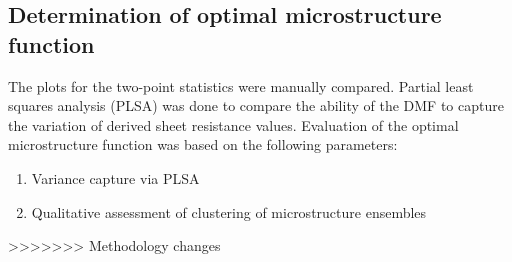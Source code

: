 \subsection{Determination of optimal microstructure function}
The plots for the two-point statistics were manually compared.
Partial least squares analysis (PLSA) was done to compare the ability of the DMF to capture the variation of derived sheet resistance values.
Evaluation of the optimal microstructure function was based on the following parameters:

\begin{enumerate}
  \item Variance capture via PLSA
  \item Qualitative assessment of clustering of microstructure ensembles
\end{enumerate}
>>>>>>> Methodology changes
